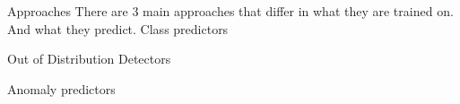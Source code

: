 \chap Approaches
There are 3 main approaches that differ in what they are trained on. And what they predict.
\sec Class predictors

\sec Out of Distribution Detectors

\sec Anomaly predictors
